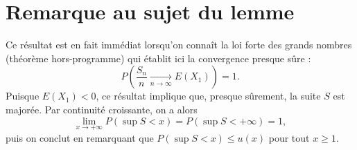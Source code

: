 \section{Remarque au sujet du lemme}

Ce résultat est en fait immédiat lorsqu'on connaît la loi forte des grands nombres (théorème hors-programme) qui établit ici la convergence presque sûre :
\[
P\left(\frac{S_n}{n} \xrightarrow[n\to\infty]{} E(X_1)\right) = 1.
\]
Puisque $E(X_1) < 0$, ce résultat implique que, presque sûrement, la suite $S$ est majorée. Par continuité croissante, on a alors
\[
\lim_{x\to+\infty} P(\sup S < x) = P(\sup S < +\infty) = 1,
\]
puis on conclut en remarquant que $P(\sup S < x) \leq u(x)$ pour tout $x \geq 1$.


